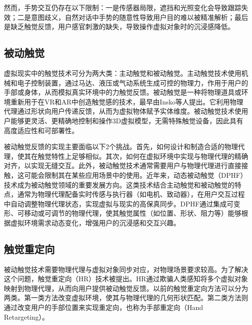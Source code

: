 \documentclass[runningheads]{llncs}
\begin{document}
然而，手势交互仍存在以下限制\cite{herbert2024static,app14114935}：一是传感器局限，遮挡和光照变化会导致跟踪失效；二是意图歧义，自然对话中手势的随意性导致用户目的难以被精准解析；最后是缺乏触觉反馈，用户感官刺激的缺失，导致操作虚拟对象时的沉浸感降低。

\subsection{被动触觉}
虚拟现实中的触觉技术可分为两大类：主动触觉和被动触觉。主动触觉技术使用机械和电子控制装置，通过马达、液压或气动系统生成可控的物理力，作用于用户的手部或身体，从而模拟真实环境中的力触觉反馈\cite{vaghela2021active}。被动触觉是一种将物理道具或环境重新用于在VR和AR中创造触觉感的技术，最早由Insko等人提出\cite{insko2001passive}。它利用物理代理通过形状向用户传递反馈，从而为虚拟物体赋予实体维度。被动触觉技术使用户能够更灵活、更精确地控制和操作3D虚拟模型，无需特殊触觉设备，因此具有高度适应性和可部署性\cite{henderson2008opportunistic,shapira2016tactilevr,10.1145/3313831.3376313}。

被动触觉反馈的实现主要面临以下2个挑战。首先，如何设计和制造合适的物理代理，使其在触觉特性上足够相似。其次，如何在虚拟环境中实现与物理代理的精确对齐，以实现无缝交互\cite{zenner2021combining}。此外，被动触觉技术通常需要用户与物理代理进行直接接触，这可能会限制其在某些应用场景中的使用。近年来，动态被动触觉（DPHF）技术成为被动触觉领域的重要发展方向。这类技术结合主动触觉和被动触觉的特点，通常为物理代理配备实时传感与执行器（如电机、致动器），在用户交互过程中自动调整物理代理状态，实现虚拟与现实的高保真同步。DPHF通过集成可变形、可移动或可调节的物理代理，使其触觉属性（如位置、形状、阻力等）能够根据虚拟环境需求动态变化，增强用户的沉浸感和交互兴趣\cite{zenner2017shifty}。


\subsection{触觉重定向}
被动触觉技术需要物理代理与虚拟对象同步对应，对物理场景要求较高。为了解决这个问题，触觉重定向（HR）技术被提出。HR通过欺骗人类感知将多个虚拟对象映射到物理代理，从而向用户提供被动触觉反馈。以前的触觉重定向方法可以分为两类。第一类方法改变虚拟环境，使其与物理代理的几何形状匹配\cite{zenner2017shifty,10.1145/2858036.2858226}。第二类方法则通过改变用户的手部位置来实现重定向\cite{zenner2019estimating,hartfill2021analysis}，也称为手部重定向（Hand Retargeting）\cite{zenner2021hart}。
\end{document}
